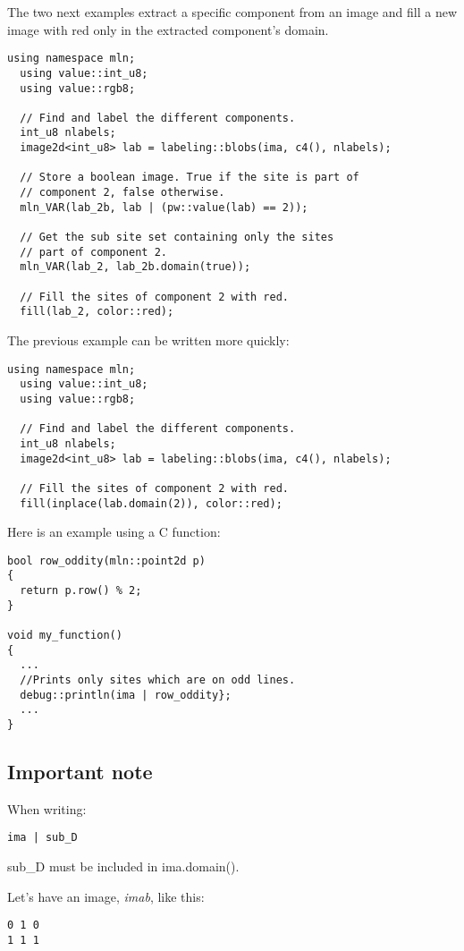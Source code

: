 \documentclass{report}
\begin{document}
The two next examples extract a specific component from an image and fill a new
image with red only in the extracted component's domain.
\begin{lstlisting}[frame=single]
  using namespace mln;
  using value::int_u8;
  using value::rgb8;

  // Find and label the different components.
  int_u8 nlabels;
  image2d<int_u8> lab = labeling::blobs(ima, c4(), nlabels);

  // Store a boolean image. True if the site is part of
  // component 2, false otherwise.
  mln_VAR(lab_2b, lab | (pw::value(lab) == 2));

  // Get the sub site set containing only the sites
  // part of component 2.
  mln_VAR(lab_2, lab_2b.domain(true));

  // Fill the sites of component 2 with red.
  fill(lab_2, color::red);
\end{lstlisting}

The previous example can be written more quickly:
\begin{lstlisting}[frame=single]
  using namespace mln;
  using value::int_u8;
  using value::rgb8;

  // Find and label the different components.
  int_u8 nlabels;
  image2d<int_u8> lab = labeling::blobs(ima, c4(), nlabels);

  // Fill the sites of component 2 with red.
  fill(inplace(lab.domain(2)), color::red);
\end{lstlisting}

Here is an example using a C function:
\begin{lstlisting}[frame=single]
bool row_oddity(mln::point2d p)
{
  return p.row() % 2;
}

void my_function()
{
  ...
  //Prints only sites which are on odd lines.
  debug::println(ima | row_oddity};
  ...
}
\end{lstlisting}
%
%
\medskip
%
%
\subsection*{Important note}
When writing:

\begin{lstlisting}[frame=single]
  ima | sub_D
\end{lstlisting}

sub\_D must be included in ima.domain().

Let's have an image, \textit{imab}, like this:
\begin{lstlisting}[frame=single]
0 1 0
1 1 1
\end{lstlisting}
\end{document}
